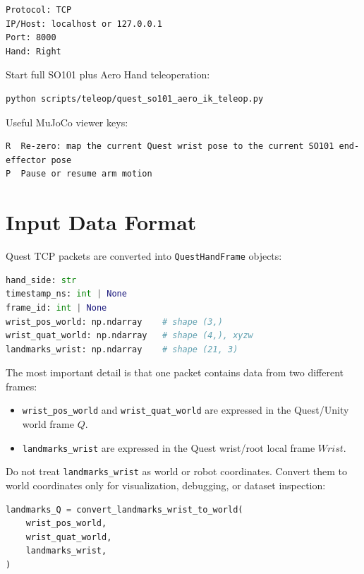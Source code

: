 \documentclass[11pt]{article}
\begin{document}
\begin{lstlisting}
Protocol: TCP
IP/Host: localhost or 127.0.0.1
Port: 8000
Hand: Right
\end{lstlisting}

Start full SO101 plus Aero Hand teleoperation:

\begin{lstlisting}
python scripts/teleop/quest_so101_aero_ik_teleop.py
\end{lstlisting}

Useful MuJoCo viewer keys:

\begin{lstlisting}
R  Re-zero: map the current Quest wrist pose to the current SO101 end-effector pose
P  Pause or resume arm motion
\end{lstlisting}

\section{Input Data Format}

Quest TCP packets are converted into \texttt{QuestHandFrame} objects:

\begin{lstlisting}[language=Python]
hand_side: str
timestamp_ns: int | None
frame_id: int | None
wrist_pos_world: np.ndarray    # shape (3,)
wrist_quat_world: np.ndarray   # shape (4,), xyzw
landmarks_wrist: np.ndarray    # shape (21, 3)
\end{lstlisting}

The most important detail is that one packet contains data from two different
frames:

\begin{itemize}
  \item \texttt{wrist\_pos\_world} and \texttt{wrist\_quat\_world} are expressed in the Quest/Unity world frame $Q$.
  \item \texttt{landmarks\_wrist} are expressed in the Quest wrist/root local frame $Wrist$.
\end{itemize}

Do not treat \texttt{landmarks\_wrist} as world or robot coordinates. Convert
them to world coordinates only for visualization, debugging, or dataset
inspection:

\begin{lstlisting}[language=Python]
landmarks_Q = convert_landmarks_wrist_to_world(
    wrist_pos_world,
    wrist_quat_world,
    landmarks_wrist,
)
\end{lstlisting}
\end{document}
